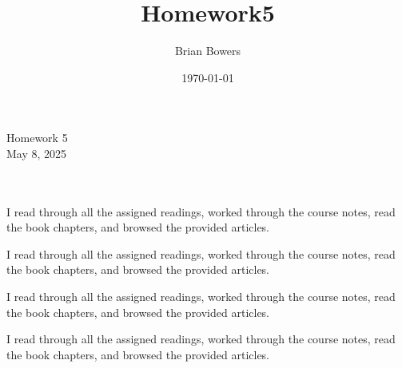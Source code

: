 \documentclass[11pt, letterpaper]{article}
\title{Homework5}
\author{Brian Bowers}
\date{\today}
\begin{document}
\begin{flushright}
    Homework 5 \\
    May 8, 2025
\end{flushright}

\\

 \\

 I read through all the assigned readings, worked through the course notes, read the book chapters, and browsed the provided articles.

 I read through all the assigned readings, worked through the course notes, read the book chapters, and browsed the provided articles.

 I read through all the assigned readings, worked through the course notes, read the book chapters, and browsed the provided articles.

 I read through all the assigned readings, worked through the course notes, read the book chapters, and browsed the provided articles. \\
\end{document}
